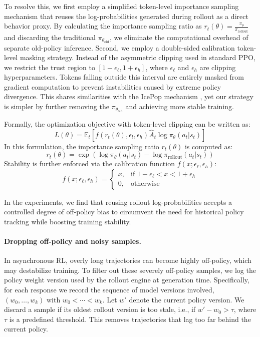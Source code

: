 \documentclass{article}
\theoremstyle{definition}
\begin{document}
To resolve this, we first employ a simplified token-level importance sampling mechanism that reuses the log-probabilities generated during rollout as a direct behavior proxy. By calculating the importance sampling ratio as $r_t(\theta) = \frac{\pi_{\theta}}{\pi_{\text{rollout}}}$ and discarding the traditional $\pi_{\theta_{\text{old}}}$, we eliminate the computational overhead of separate old-policy inference. Second, we employ a double-sided calibration token-level masking strategy. Instead of the asymmetric clipping used in standard PPO, we restrict the trust region to $[1-\epsilon_\ell, 1+\epsilon_h]$, where $\epsilon_\ell$ and $\epsilon_h$ are clipping hyperparameters. Tokens falling outside this interval are entirely masked from gradient computation to prevent instabilities caused by extreme policy divergence. This shares similarities with the IcePop mechanism \cite{team2025every}, yet our strategy is simpler by further removing the $\pi_{\theta_{\text{old}}}$ and achieving more stable training. 

Formally, the optimization objective with token-level clipping can be written as:
\begin{equation}
    L(\theta) = \mathbb{E}_t \left[ f(r_t(\theta), \epsilon_l, \epsilon_h) \hat{A}_t \log \pi_{\theta}(a_t|s_t) \right]
\end{equation}
In this formulation, the importance sampling ratio $r_t(\theta)$ is computed as:
\begin{equation}
    r_t(\theta) = \exp\left( \log \pi_\theta(a_t|s_t) - \log \pi_{\text{rollout}}(a_t|s_t) \right)
\end{equation}
Stability is further enforced via the calibration function $f(x; \epsilon_\ell, \epsilon_h)$:
\begin{equation}
    f(x; \epsilon_\ell, \epsilon_h) = 
    \begin{cases} 
    x, & \text{if } 1-\epsilon_\ell < x < 1+\epsilon_h \\
    0, & \text{otherwise}
    \end{cases}
\end{equation}

In the experiments, we find that reusing rollout log-probabilities accepts a controlled degree of off-policy bias to circumvent the need for historical policy tracking while boosting training stability.

\paragraph{Dropping off-policy and noisy samples.}
In asynchronous RL, overly long trajectories can become highly off-policy, which may destabilize training. To filter out these severely off-policy samples, we log the policy weight version used by the rollout engine at generation time. Specifically, for each response we record the sequence of model versions involved, $(w_0, \ldots, w_k)$ with $w_0 < \cdots < w_k$. Let $w'$ denote the current policy version. We discard a sample if its oldest rollout version is too stale, i.e., if $w' - w_0 > \tau$, where $\tau$ is a predefined threshold. This removes trajectories that lag too far behind the current policy.
\end{document}
